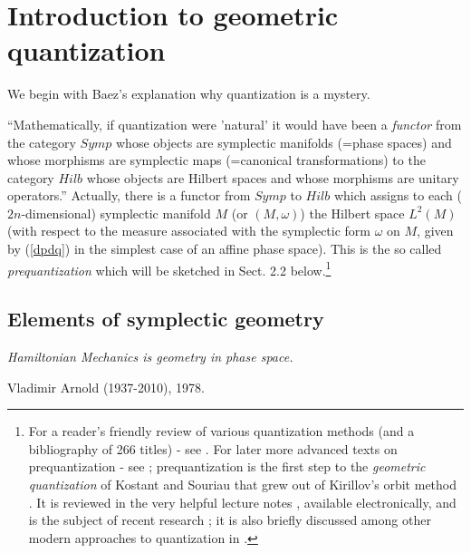\bigskip

\section{Introduction to geometric quantization}
\setcounter{equation}{0}
\renewcommand\theequation{\thesection.\arabic{equation}}


\smallskip

 We begin with Baez's explanation \cite{B06} why quantization is a mystery.

``Mathematically, if quantization were 'natural' it would have been a {\it
functor} from the category $Symp$ whose objects are symplectic manifolds
(=phase spaces) and whose morphisms are symplectic maps (=canonical 
transformations)
to the category $Hilb$ whose objects are Hilbert spaces and whose morphisms are
unitary operators.'' Actually, there is a functor from $Symp$ to $Hilb$ which 
assigns to each ($2n$-dimensional) symplectic manifold $M$ (or $(M, \omega)$) 
the Hilbert space $L^2(M)$ (with respect to the measure associated with the symplectic form
 $\omega$ on $M$, given by (\ref{dpdq}) in the simplest case of an affine 
phase space). This is the so called {\it prequantization} which will be 
sketched in Sect. 2.2 below.\footnote{For a reader's friendly review of various 
quantization methods (and a bibliography of 266 titles) - see \cite{AE}. 
For later more advanced texts on prequantization -
 see \cite{WZ, ZZ}; prequantization is the first step to the {\it
geometric quantization} \cite{Wo} of Kostant and Souriau that grew out of
Kirillov's orbit method \cite{K99}. It is reviewed in the very helpful lecture
notes \cite{B}, available electronically, and is the subject of recent research
\cite{H90, AdPW}; it is also briefly discussed among other modern 
approaches to quantization in \cite{GW, G10}.}

\smallskip

\subsection{Elements of symplectic geometry}
\begin{flushright}
{\it Hamiltonian Mechanics is geometry in phase space.}

 Vladimir Arnold (1937-2010), 1978.
\end{flushright}
 


